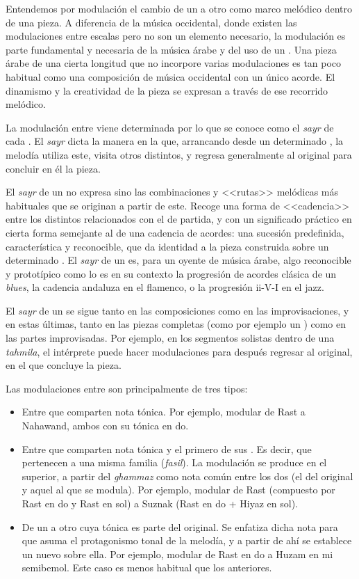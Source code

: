 Entendemos por modulación el cambio de un \maqam a otro como marco melódico dentro de una pieza. A diferencia de la música occidental, donde existen las modulaciones entre escalas pero no son un elemento necesario, la modulación es parte fundamental y necesaria de la música árabe y del uso de un \maqamb. Una pieza árabe de una cierta longitud que no incorpore varias modulaciones es tan poco habitual como una composición de música occidental con un único acorde. El dinamismo y la creatividad de la pieza se expresan a través de ese recorrido melódico.

La modulación entre \maqamaat viene determinada por lo que se conoce como el \emph{sayr} de cada \maqam. El \emph{sayr} dicta la manera en la que, arrancando desde un determinado \maqam, la melodía utiliza este, visita otros \maqamaat distintos, y regresa generalmente al original para concluir en él la pieza.

El \emph{sayr} de un \maqam no expresa sino las combinaciones y <<rutas>> melódicas más habituales que se originan a partir de este. Recoge una forma de <<cadencia>> entre los distintos \maqamaat relacionados con el de partida, y con un significado práctico en cierta forma semejante al de una cadencia de acordes: una sucesión predefinida, característica y reconocible, que da identidad a la pieza construida sobre un determinado \maqamb. El \emph{sayr} de un \maqam es, para un oyente de música árabe, algo reconocible y prototípico como lo es en su contexto la progresión de acordes clásica de un \emph{blues}, la cadencia andaluza en el flamenco, o la progresión ii-V-I en el jazz.

El \emph{sayr} de un \maqam se sigue tanto en las composiciones como en las improvisaciones, y en estas últimas, tanto en las piezas completas (como por ejemplo un \taqsimb) como en las partes improvisadas. Por ejemplo, en los segmentos solistas dentro de una \emph{tahmila}, el intérprete puede hacer modulaciones para después regresar al \maqam original, en el que concluye la pieza.

Las modulaciones entre \maqamaat son principalmente de tres tipos:

\begin{itemize}
\item Entre \maqamaat que comparten nota tónica. Por ejemplo, modular de Rast a Nahawand, ambos con su tónica en do.
\item Entre \maqamaat que comparten nota tónica y el primero de sus \yinsb. Es decir, que pertenecen a una misma familia (\emph{fasil}). La modulación se produce en el \yins superior, a partir del \emph{ghammaz} como nota común entre los dos \ashnas (el del \maqam original y aquel al que se modula). Por ejemplo, modular de Rast (compuesto por \yins Rast en do y \yins Rast en sol) a \maqam Suznak (Rast en do + Hiyaz en sol).
\item De un \maqam a otro cuya tónica es parte del \maqam original. Se enfatiza dicha nota para que asuma el protagonismo tonal de la melodía, y a partir de ahí se establece un nuevo \maqam sobre ella. Por ejemplo, modular de Rast en do a Huzam en mi semibemol. Este caso es menos habitual que los anteriores.
\end{itemize}


